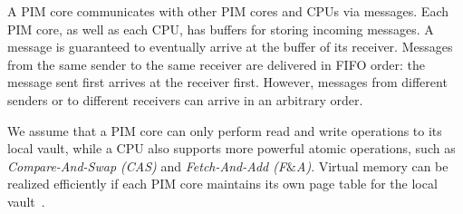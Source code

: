 A PIM core communicates with other PIM cores and CPUs via messages.
Each PIM core, as well as each CPU, has buffers for storing incoming
messages.  A message is guaranteed to eventually arrive at the buffer
of its receiver.  Messages from the same sender to the same receiver
are delivered in FIFO order: the message sent first arrives at the
receiver first.  However, messages from different senders or to
different receivers can arrive in an arbitrary order.

We assume that a PIM core can only perform read and write operations
to its local vault, while a CPU also supports more powerful atomic
operations, such as \emph{Compare-And-Swap (CAS)} and
\emph{Fetch-And-Add (F$\&$A)}.  Virtual memory can be realized
efficiently if each PIM core maintains its own page table for the
local vault~\cite{hsieh2016accelerating}.
